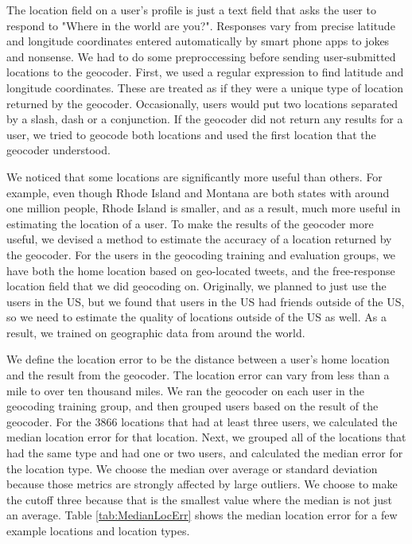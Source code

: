 \documentclass{sig-alternate}
\begin{document}
The location field on a user's profile is just a text field that asks the user to respond to "Where in the world are you?".
Responses vary from precise latitude and longitude coordinates entered automatically by smart phone apps to jokes and nonsense.
We had to do some preproccessing before sending user-submitted locations to the geocoder.
First, we used a regular expression to find latitude and longitude coordinates. These are treated as if they were a unique type of location returned by the geocoder.
Occasionally, users would put two locations separated by a slash, dash or a conjunction. If the geocoder did not return any results for a user, we tried to geocode both locations and used the first location that the geocoder understood.

We noticed that some locations are significantly more useful than others.
For example, even though Rhode Island and Montana are both states with around
one million people, Rhode Island is smaller, and as a result, much more useful
in estimating the location of a user.
To make the results of the geocoder more useful, we devised a method to estimate the accuracy of a location returned by the geocoder.
For the users in the geocoding training and evaluation groups, we have both the
home location based on geo-located tweets, and the free-response location field
that we did geocoding on.
Originally, we planned to just use the users in the US, but we found that users
in the US had friends outside of the US, so we need to estimate the quality of
locations outside of the US as well.
As a result, we trained on geographic data from around the world.

We define the location error to be the distance between a user's home location and the result from the geocoder.
The location error can vary from less than a mile to over ten thousand miles.
We ran the geocoder on each user in the geocoding training group, and then grouped users based on the result of the geocoder.
For the 3866 locations that had at least three users, we calculated the median location error for that location.
Next, we grouped all of the locations that had the same type and had one or two users, and calculated the median error for the location type.
We choose the median over average or standard deviation because those metrics are strongly affected by large outliers.
We choose to make the cutoff three because that is the smallest value where the median is not just an average.
Table \ref{tab:MedianLocErr} shows the median location error for a few example locations and location types.
\end{document}
